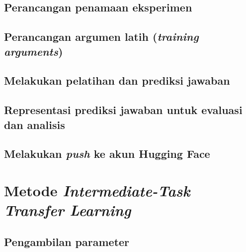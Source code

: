 \subsection{Perancangan penamaan eksperimen}

\subsection{Perancangan argumen latih (\emph{training arguments})}

\subsection{Melakukan pelatihan dan prediksi jawaban}

\subsection{Representasi prediksi jawaban untuk evaluasi dan analisis}

\subsection{Melakukan \emph{push} ke akun Hugging Face}

\section{Metode \emph{Intermediate-Task Transfer Learning}}

\subsection{Pengambilan parameter}

